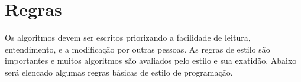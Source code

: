 \documentclass[conference]{IEEEtran}
\begin{document}
\begin{comment}
Operadores e Conectivos
37 tokens são operadores, formados dos caracteres da tabela ASCII
 
=
==
+
+=
>
<=
-
-=
<
>=
*
*=
!
!=
/
/=
~
||
|
|=
:
++
^
^=
--
%
<<
<<=
>>

>>=
>>>
>>>

\end{comment}

\section{Regras}
Os algoritmos devem ser escritos priorizando a facilidade de leitura, entendimento, e a modificação por outras pessoas. As regras de estilo são importantes e muitos algoritmos são avaliados pelo estilo e sua exatidão. Abaixo será elencado algumas regras básicas de estilo de programação.
\end{document}
